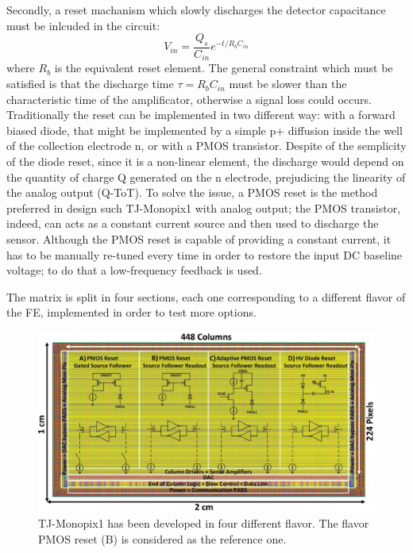         Secondly, a reset machanism which slowly discharges the detector capacitance must be inlcuded in the circuit:
        \begin{equation}
            V_{in } = \frac{Q_s}{C_{in}}e^{-t/R_bC_{in}}
        \end{equation}
        where $R_b$ is the equivalent reset element. The general constraint which must be satisfied is that the discharge time $\tau=R_bC_{in}$ must be slower than the characteristic time of the amplificator, otherwise a signal loss could occurs.
        Traditionally the reset can be implemented in two different way: with a forward biased diode, that might be implemented by a simple p+ diffusion inside the well of the collection electrode n, or with a PMOS transistor. 
        Despite of the semplicity of the diode reset, since it is a non-linear element, the discharge would depend on the quantity of charge Q generated on the n electrode, prejudicing the linearity of the analog output (Q-ToT). To solve the issue, a PMOS reset is the method preferred in design such TJ-Monopix1 with analog output; the PMOS transistor, indeed, can acts as a constant current source and then used to discharge the sensor. 
        Although the PMOS reset is capable of providing a constant current, it has to be manually re-tuned every time in order to restore the input DC baseline voltage; to do that a low-frequency feedback is used. 

        The matrix is split in four sections, each one corresponding to a different flavor of the FE, implemented in order to test more options. 
        \begin{figure}[h!]
            \centering
            \includegraphics[width=.8\linewidth]{figures/Monopix1/Monopix1_flavors.png}
            \caption{TJ-Monopix1 has been developed in four different flavor. The flavor PMOS reset (B) is considered as the reference one.
            }
            \label{fig:Monopix1_flavors}
        \end{figure}    
        
